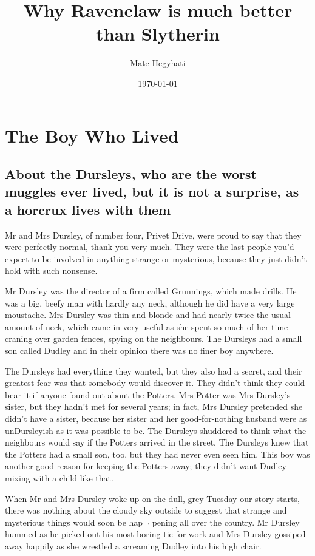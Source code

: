 \documentclass[twoside, openany]{report}
\author{Mate \underline{Hegyhati}}
\title{Why Ravenclaw is much better than Slytherin}
\date{\today}
\begin{document}
    \maketitle
    

    \tableofcontents

\chapter{The Boy Who Lived}

\section[About the Dursleys]{About the Dursleys\label{introD}, who are the worst muggles ever lived, but it is not a surprise, as a horcrux lives with them}
Mr and Mrs Dursley, of number four, Privet Drive, were proud to 
say that they were perfectly normal, thank you very much. They 
were the last people you'd expect to be involved in anything 
strange or mysterious, because they just didn't hold with such 
nonsense. 

Mr Dursley was the director of a firm called Grunnings, which 
made drills. He was a big, beefy man with hardly any neck, 
although he did have a very large moustache. Mrs Dursley was 
thin and blonde and had nearly twice the usual amount of neck, 
which came in very useful as she spent so much of her time craning 
over garden fences, spying on the neighbours. The Dursleys had a 
small son called Dudley and in their opinion there was no finer 
boy anywhere. 

The Dursleys had everything they wanted, but they also had a 
secret, and their greatest fear was that somebody would discover 
it. They didn't think they could bear it if anyone found out about 
the Potters. Mrs Potter was Mrs Dursley's sister, but they hadn't 
met for several years; in fact, Mrs Dursley pretended she didn't 
have a sister, because her sister and her good-for-nothing husband 
were as unDursleyish as it was possible to be. The Dursleys 
shuddered to think what the neighbours would say if the Potters 
arrived in the street. The Dursleys knew that the Potters had a 
small son, too, but they had never even seen him. This boy was 
another good reason for keeping the Potters away; they didn't 
want Dudley mixing with a child like that. 

When Mr and Mrs Dursley woke up on the dull, grey Tuesday 
our story starts, there was nothing about the cloudy sky outside to 
suggest that strange and mysterious things would soon be hap¬ 
pening all over the country. Mr Dursley hummed as he picked out 
his most boring tie for work and Mrs Dursley gossiped away 
happily as she wrestled a screaming Dudley into his high chair. 
\end{document}
